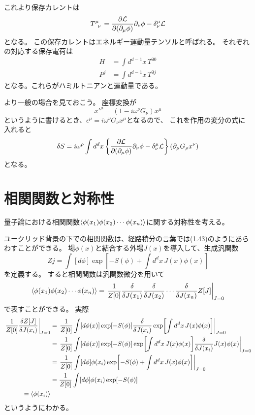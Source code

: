 \documentclass[../../master.tex]{subfiles}
\begin{document}
これより保存カレントは
\begin{equation}
    T\indices{^\mu_\nu} = \pdv{\mathcal{L}}{(\partial_\mu\phi)}\partial_\nu\phi - \delta_\nu^\mu \mathcal{L}
\end{equation}
となる。
この保存カレントはエネルギー運動量テンソルと呼ばれる。
それぞれの対応する保存電荷は
\begin{align}
    H &= \int d^{d-1}x\, T^{00}\\
    P^j &= \int d^{d-1}x\, T^{0j}
\end{align}
となる。これらがハミルトニアンと運動量である。

より一般の場合を見ておこう。
座標変換が
\begin{equation*}
    x'^\mu = (1 -i \omega^\nu G_\nu)x^\mu
\end{equation*}
というように書けるとき、\(\epsilon^\mu = i\omega^\nu G_\nu x^\mu\)となるので、
これを作用の変分の式に入れると
\begin{equation*}
    \var{S}
    = i\omega^\rho \int d^dx\, \qty{\pdv{\mathcal{L}}{(\partial_\mu\phi)}\partial_\nu\phi - \delta_\nu^\mu \mathcal{L}}(\partial_\mu G_\rho x^\nu)
\end{equation*}
となる。

\section{相関関数と対称性}
量子論における相関関数\(\ev{\phi(x_1)\phi(x_2)\cdots\phi(x_n)}\)に関する対称性を考える。

ユークリッド背景の下での相関関数は、経路積分の言葉では(1.43)のようにあらわすことができる。
場\(\phi(x)\)と結合する外場\(J(x)\)を導入して、生成汎関数
\begin{equation}
    Z{j} = \int [d\phi] \exp[-S(\phi)+\int d^dx\, J(x)\phi(x)]
\end{equation}
を定義する。
すると相関関数は汎関数微分を用いて
\begin{equation}
    \ev{\phi(x_1)\phi(x_2)\cdots\phi(x_n)} = \left. \frac{1}{Z[0]}\fdv{J(x_1)}\fdv{J(x_2)}\cdots\fdv{J(x_n)}Z[J]\right|_{J=0}
\end{equation}
で表すことができる。
実際
\begin{align*}
    \left.\frac{1}{Z[0]}\fdv{Z[J]}{J(x_i)}\right|_{J=0}
    &= \left.\frac{1}{Z[0]}\int [d\phi(x)]\exp[-S(\phi)]\fdv{J(x_i)}\exp[\int d^dx\, J(x)\phi(x)]\right|_{J=0}\\
    &= \left.\frac{1}{Z[0]}\int [d\phi(x)]\exp[-S(\phi)]\exp[\int d^dx\, J(x)\phi(x)]\fdv{J(x_i)}J(x)\phi(x)\right|_{J=0}\\
    &= \left.\frac{1}{Z[0]}\int [d\phi] \phi(x_i)\exp[-S(\phi)+\int d^dx\, J(x)\phi(x)]\right|_{J=0}\\
    &= \frac{1}{Z[0]}\int [d\phi] \phi(x_i)\exp[-S(\phi)]\\
    =\ev{\phi(x_i)}
\end{align*}
というようにわかる。
\end{document}
